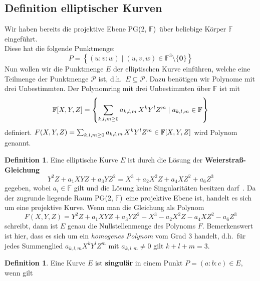\documentclass[hidelinks]{article}
\theoremstyle{plain}
\theoremstyle{definition}
\newtheorem{defn}[thm]{Definition}
\theoremstyle{rem}
\newcommand{\pgtwo}{PG(2, $\mathbb{F}$)\ }
\newcommand{\ftnz}{\mathbb{F}^{3}\setminus\{\boldsymbol 0\}}
\begin{document}
\begin{sloppypar}
\subsection{Definition elliptischer Kurven} \label{definition-ek}
Wir haben bereits die projektive Ebene \pgtwo über beliebige Körper $\mathbb{F}$ eingeführt.\\
Diese hat die folgende Punktmenge:
\begin{equation*}
    P = \left\{(u:v:w) \mid (u,v,w) \in \ftnz \right\}
\end{equation*}
Nun wollen wir die Punktmenge $E$ der elliptischen Kurve einführen, welche eine Teilmenge der Punktmenge $\mathcal{P}$ ist, d.h.\ $E \subseteq \mathcal{P}$. 
Dazu benötigen wir Polynome mit drei Unbestimmten.
Der Polynomring mit drei Unbestimmten über $\mathbb{F}$ ist mit 
\begin{equation*}
    \mathbb{F}[X,Y,Z] = \left\{ \sum_{k,l,m \geq 0} a_{k,l,m} \thinspace X^k Y^l Z^m \mid a_{k,l,m} \in \mathbb{F} \right\}
\end{equation*}
definiert. 
$F(X,Y,Z) = \sum_{k,l,m \geq 0} a_{k,l,m} \thinspace X^k Y^l Z^m \in \mathbb{F}[X,Y,Z]$ wird Polynom genannt. 
\begin{defn}\label{weierstrass}
	Eine elliptische Kurve $E$ ist durch die Lösung der \textbf{Weierstraß-Gleichung} 
    \begin{equation*}
        Y^2Z + a_1XYZ + a_3YZ^2 = X^3 + a_2X^2Z + a_4XZ^2 + a_6Z^3
    \end{equation*}
    gegeben, wobei $a_i \in \mathbb{F}$ gilt und die Lösung keine Singularitäten besitzen darf~\cite[Seite~54]{milne2006}.
    Da der zugrunde liegende Raum \pgtwo eine projektive Ebene ist, handelt es sich um eine projektive Kurve. 
    Wenn man die Gleichung als Polynom 
    \begin{equation*}
        F(X,Y,Z) = Y^2Z + a_1XYZ + a_3YZ^2 - X^3 - a_2X^2Z - a_4XZ^2 -a_6Z^3
    \end{equation*}
    schreibt, dann ist $E$ genau die Nullstellenmenge des Polynoms $F$. Bemerkenswert ist hier, dass es sich um ein \textit{homogenes Polynom} vom Grad 3 handelt, d.h.\ für jedes Summenglied $a_{k,l,m}X^kY^lZ^m$ mit $a_{k,l,m} \neq 0$ gilt $k + l + m = 3$.
\end{defn}
\begin{defn} \label{singularitaeten}
	Eine Kurve $E$ ist \textbf{singulär} in einem Punkt \mbox{$P=(a:b:c)\in E$}, wenn gilt

\end{defn}
\end{sloppypar}
\end{document}
